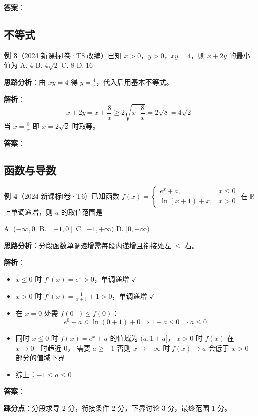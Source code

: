 \textbf{答案}：

\subsection{不等式}

\textbf{例 3}（2024 新课标Ⅰ卷·T8 改编）已知 $x>0$，$y>0$，$xy=4$，则 $x+2y$ 的最小值为
A. $4$ \quad B. $4\sqrt{2}$ \quad C. $8$ \quad D. $16$

\textbf{思路分析}：由 $xy=4$ 得 $y=\frac{4}{x}$，代入后用基本不等式。

\textbf{解析}：
\[
x + 2y = x + \frac{8}{x} \ge 2\sqrt{x\cdot\frac{8}{x}} = 2\sqrt{8} = 4\sqrt{2}
\]
当 $x = \frac{8}{x}$ 即 $x=2\sqrt{2}$ 时取等。

\textbf{答案}：

\subsection{函数与导数}

\textbf{例 4}（2024 新课标Ⅰ卷·T6）已知函数 $f(x) = \begin{cases} e^x + a, & x \le 0 \\ \ln(x+1) + x, & x > 0 \end{cases}$ 在 $\mathbb{R}$ 上单调递增，则 $a$ 的取值范围是

A. $(-\infty,0]$ \quad B. $[-1,0]$ \quad C. $[-1,+\infty)$ \quad D. $[0,+\infty)$

\textbf{思路分析}：分段函数单调递增需每段内递增且衔接处左 $\le$ 右。

\textbf{解析}：
\begin{itemize}
  \item $x\le 0$ 时 $f'(x)=e^x>0$，单调递增 $\checkmark$
  \item $x>0$ 时 $f'(x)=\frac{1}{x+1}+1>0$，单调递增 $\checkmark$
  \item 在 $x=0$ 处需 $f(0^-) \le f(0)$：
    \[
    e^0 + a \le \ln(0+1) + 0 \Rightarrow 1+a \le 0 \Rightarrow a \le 0
    \]
  \item 同时 $x\le 0$ 时 $f(x)=e^x+a$ 的值域为 $(a,1+a]$，
    $x>0$ 时 $f(x)$ 在 $x\to0^+$ 时趋近 $0$，
    需要 $a \ge -1$ 否则 $x\to -\infty$ 时 $f(x)\to a$ 会低于 $x>0$ 部分的值域下界
  \item 综上：$-1 \le a \le 0$
\end{itemize}

\textbf{答案}：

\textbf{踩分点}：分段求导 2 分，衔接条件 2 分，下界讨论 3 分，最终范围 1 分。

